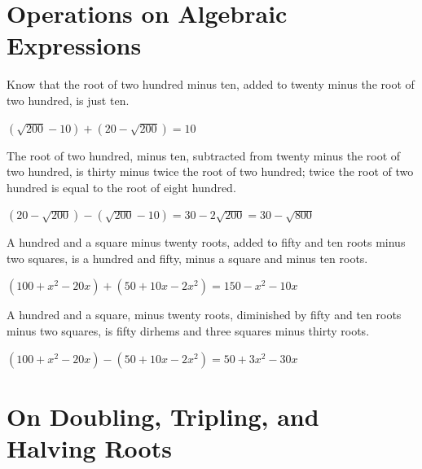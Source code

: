 \documentclass[11pt,a4paper,openany,oneside]{book}
\begin{document}
\begin{minipage}[t]{0.48\textwidth}
\raggedright

\section*{Operations on Algebraic Expressions}

Know that the root of two hundred minus ten, added to twenty minus the root of two hundred, is just ten.

$(\sqrt{200} - 10) + (20 - \sqrt{200}) = 10$

\vspace{0.2cm}

The root of two hundred, minus ten, subtracted from twenty minus the root of two hundred, is thirty minus twice the root of two hundred; twice the root of two hundred is equal to the root of eight hundred.

$(20 - \sqrt{200}) - (\sqrt{200} - 10) = 30 - 2\sqrt{200} = 30 - \sqrt{800}$

\vspace{0.2cm}

A hundred and a square minus twenty roots, added to fifty and ten roots minus two squares, is a hundred and fifty, minus a square and minus ten roots.

$(100 + x^2 - 20x) + (50 + 10x - 2x^2) = 150 - x^2 - 10x$

\vspace{0.2cm}

A hundred and a square, minus twenty roots, diminished by fifty and ten roots minus two squares, is fifty dirhems and three squares minus thirty roots.

$(100 + x^2 - 20x) - (50 + 10x - 2x^2) = 50 + 3x^2 - 30x$

\end{minipage}
\vspace{0.3cm}

\newpage

\section*{On Doubling, Tripling, and Halving Roots}
\end{document}
